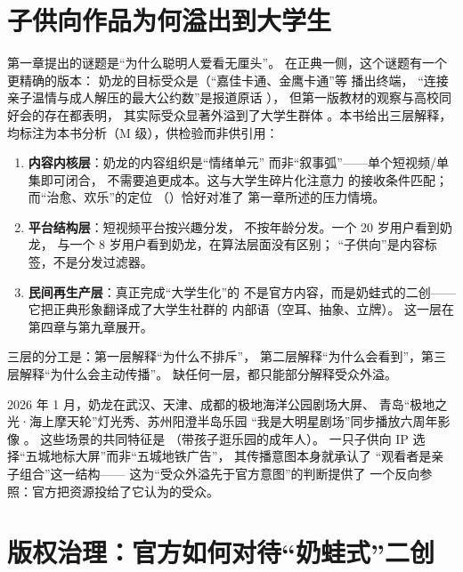 \section{子供向作品为何溢出到大学生}\label{sec:03:overflow}

第一章提出的谜题是“为什么聪明人爱看无厘头”。
在正典一侧，这个谜题有一个更精确的版本：
奶龙的目标受众是（“嘉佳卡通、金鹰卡通”等
播出终端\cite{chinadaily2026six}，
“连接亲子温情与成人解压的最大公约数”是报道原话
\cite{chinadaily2026six}），
但第一版教材的观察与高校同好会的存在都表明，
其实际受众显著外溢到了大学生群体
。本书给出三层解释，
均标注为本书分析（M 级），供检验而非供引用：

\begin{enumerate}[label=\arabic*.]
  \item \textbf{内容内核层}：奶龙的内容组织是“情绪单元”
        而非“叙事弧”——单个短视频/单集即可闭合，
        不需要追更成本。这与大学生碎片化注意力
        的接收条件匹配；而“治愈、欢乐”的定位
        （\cite{jiang2026nailong}）恰好对准了
        第一章所述的压力情境。
  \item \textbf{平台结构层}：短视频平台按兴趣分发，
        不按年龄分发。一个 20 岁用户看到奶龙，
        与一个 8 岁用户看到奶龙，在算法层面没有区别；
        “子供向”是内容标签，不是分发过滤器。
  \item \textbf{民间再生产层}：真正完成“大学生化”的
        不是官方内容，而是奶蛙式的二创——
        它把正典形象翻译成了大学生社群的
        内部语（空耳、抽象、立牌）。
        这一层在第四章与第九章展开。
\end{enumerate}

三层的分工是：第一层解释“为什么不排斥”，
第二层解释“为什么会看到”，第三层解释“为什么会主动传播”。
缺任何一层，都只能部分解释受众外溢。

\begin{nlcase}
  2026 年 1 月，奶龙在武汉、天津、成都的极地海洋公园剧场大屏、
  青岛“极地之光·海上摩天轮”灯光秀、苏州阳澄半岛乐园
  “我是大明星剧场”同步播放六周年影像
  \cite{chinadaily2026six}。
  这些场景的共同特征是
  （带孩子逛乐园的成年人）。
  一只子供向 IP 选择“五城地标大屏”而非“五城地铁广告”，
  其传播意图本身就承认了
  “观看者是亲子组合”这一结构——
  这为“受众外溢先于官方意图”的判断提供了
  一个反向参照：官方把资源投给了它认为的受众。
\end{nlcase}

\section{版权治理：官方如何对待“奶蛙式”二创}\label{sec:03:copyright}

